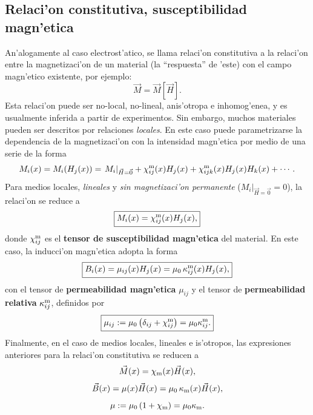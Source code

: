 \subsection{Relaci'on constitutiva, susceptibilidad magn'etica}
An'alogamente al caso electrost'atico, se llama relaci'on constitutiva a la
relaci'on entre la magnetizaci'on de un material (la ``respuesta'' de 'este)
con el campo magn'etico existente, por ejemplo:
\begin{equation}
 \vec{M}=\vec{M}[\vec{H}].
\end{equation}
Esta relaci'on puede ser no-local, no-lineal, anis'otropa e inhomog'enea, y es usualmente inferida a partir de experimentos. Sin
embargo, muchos materiales pueden ser descritos por relaciones \textit{locales}. En
este caso puede parametrizarse la dependencia de la magnetizaci'on con la
intensidad magn'etica por medio de una serie de la forma
\begin{equation}
M_i(x)=M_i(H_j(x))=\left.M_i\right|_{\vec{H}=\vec{0}}
+\chi^{\rm m}_{ij}(x)H_j(x)+\chi^{\rm m}_{ijk}(x)H_j(x)H_k(x)+\cdots.
\end{equation}
Para medios locales, \textit{lineales} y \textit{sin magnetizaci'on permanente}
($\left.M_i\right|_{\vec{H}=\vec{0}}=0$), la relaci'on se reduce a
\begin{equation}
 \boxed{M_i(x)=\chi^{\rm m}_{ij}(x)H_j(x),}
\end{equation}
donde $\chi^{\rm m}_{ij}$ es el \textbf{tensor de susceptibilidad magn'etica} del
material. En este caso, la inducci'on magn'etica adopta la forma
\begin{equation}
 \boxed{B_i(x)=\mu_{ij}(x)H_j(x)=\mu_0\,\kappa^{\rm m}_{ij}(x)H_j(x),}
\end{equation}
con el tensor de \textbf{permeabilidad magn'etica} $\mu_{ij}$ y el
tensor de \textbf{permeabilidad relativa} $\kappa^{\rm m}_{ij}$, definidos por
\begin{equation}
 \boxed{\mu_{ij}:=\mu_0\left(\delta_{ij}+\chi^{\rm
m}_{ij}\right)=\mu_0\kappa^{\rm m}_{ij}.}
\end{equation}
Finalmente, en el caso de medios locales, lineales e is'otropos, las
expresiones anteriores para la relaci'on constitutiva se reducen a
\begin{equation}
 \vec{M}(x)=\chi_{\rm m}(x)\vec{H}(x),
\end{equation}
\begin{equation}
 \vec{B}(x)=\mu(x)\vec{H}(x)=\mu_0\,\kappa_{\rm m}(x)\vec{H}(x),
\end{equation}
\begin{equation}
 \mu:=\mu_0\left(1+\chi_{\rm m}\right)=\mu_0\kappa_{\rm m}.
\end{equation}


